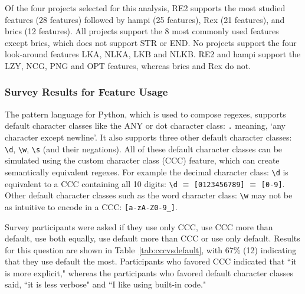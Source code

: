 Of the four projects selected for this analysis, RE2 supports the most studied features (28 features) followed by hampi (25 features),  Rex (21 features), and brics (12 features).  All projects support the 8 most commonly used features except brics, which does not support STR or END.
No projects support the four look-around features LKA, NLKA, LKB and NLKB.  RE2 and hampi support the LZY, NCG, PNG and OPT features, whereas brics and Rex do not.%


\subsubsection{Survey Results for Feature Usage}
The pattern language for Python, which is used to compose regexes, supports default character classes like the ANY or dot character class: \verb!.! meaning, `any character except newline'. %
It also supports three other default character classes: \verb!\d!, \verb!\w!, \verb!\s! (and their negations). All of these default character classes can be simulated using the custom character class (CCC) feature, which can create semantically equivalent regexes.
For example  the decimal character class: \verb!\d! is equivalent to a CCC containing all 10 digits:  \verb!\d! $\equiv$ \verb![0123456789]! $\equiv$ \verb![0-9]!.
Other default character classes such as the word character class: \verb!\w! may not be as intuitive to encode in a CCC: \verb![a-zA-Z0-9_]!.

Survey participants were asked if they use only CCC, use CCC more than default, use both equally, use default more than CCC or use only default.  Results for this question are shown in Table~\ref{tab:cccvsdefault}, with 67\% (12) indicating that they use default the most.
 Participants who favored CCC indicated that ``it is more explicit," whereas the participants who favored default character classes said,  ``it is less verbose" and ``I like using built-in code."



